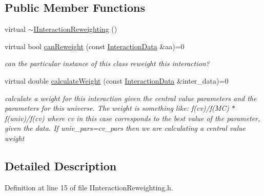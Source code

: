 \subsection*{Public Member Functions}
\begin{DoxyCompactItemize}
\item 
virtual \hyperlink{class_neutrino_flux_reweight_1_1_i_interaction_reweighting_a89723625d09e41fa33315dbf4a811d8a}{$\sim$\-I\-Interaction\-Reweighting} ()
\item 
virtual bool \hyperlink{class_neutrino_flux_reweight_1_1_i_interaction_reweighting_aa3d1d3f37a93b02e447cf5eca333ac8d}{can\-Reweight} (const \hyperlink{class_neutrino_flux_reweight_1_1_interaction_data}{Interaction\-Data} \&aa)=0
\begin{DoxyCompactList}\small\item\em can the particular instance of this class reweight this interaction? \end{DoxyCompactList}\item 
virtual double \hyperlink{class_neutrino_flux_reweight_1_1_i_interaction_reweighting_a49b0d73e778411d629205d23575703c3}{calculate\-Weight} (const \hyperlink{class_neutrino_flux_reweight_1_1_interaction_data}{Interaction\-Data} \&inter\-\_\-data)=0
\begin{DoxyCompactList}\small\item\em calculate a weight for this interaction given the central value parameters and the parameters for this universe. The weight is something like\-: f(cv)/f(M\-C) $\ast$ f(univ)/f(cv) where cv in this case corresponds to the best value of the parameter, given the data. If univ\-\_\-pars=cv\-\_\-pars then we are calculating a central value weight \end{DoxyCompactList}\end{DoxyCompactItemize}


\subsection{Detailed Description}


Definition at line 15 of file I\-Interaction\-Reweighting.\-h.




